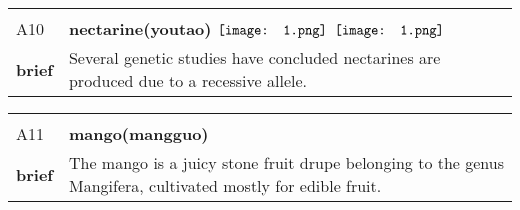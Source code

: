 \documentclass[UTF8]{article}
\begin{document}
            \begin{tabularx}{\textwidth}{p{1.5cm}X}
            \arrayrulecolor{myBlue}
        	\hline\\
            \small{A10}&
            \large{\bfseries{nectarine(youtao)}}\hfill
                                                            $\vcenter{\hbox{\texttt{[image: 1.png]}}}$
                                                                \phantom{$\vcenter{\hbox{\texttt{[image: 1.png]}}}$}
                                                                \phantom{$\vcenter{\hbox{\texttt{[image: 1.png]}}}$}
                                                                \phantom{$\vcenter{\hbox{\texttt{[image: 1.png]}}}$}
                                                                \phantom{$\vcenter{\hbox{\texttt{[image: 1.png]}}}$}
                                                                \phantom{$\vcenter{\hbox{\texttt{[image: 1.png]}}}$}
                                                                $\vcenter{\hbox{\texttt{[image: 1.png]}}}$
                                        \\[10pt]
            \large{\bfseries{brief}}&\noindent\parbox[c]{\hsize}{Several genetic studies have concluded nectarines are produced due to a recessive allele.} \\[5pt]
            \hline\\[-10pt]
        \end{tabularx}
            \begin{tabularx}{\textwidth}{p{1.5cm}X}
            \arrayrulecolor{myBlue}
        	\hline\\
            \small{A11}&
            \large{\bfseries{mango(mangguo)}}\hfill
                                                            \phantom{$\vcenter{\hbox{\texttt{[image: 1.png]}}}$}
                                                                \phantom{$\vcenter{\hbox{\texttt{[image: 1.png]}}}$}
                                                                \phantom{$\vcenter{\hbox{\texttt{[image: 1.png]}}}$}
                                                                \phantom{$\vcenter{\hbox{\texttt{[image: 1.png]}}}$}
                                                                \phantom{$\vcenter{\hbox{\texttt{[image: 1.png]}}}$}
                                                                \phantom{$\vcenter{\hbox{\texttt{[image: 1.png]}}}$}
                                                                \phantom{$\vcenter{\hbox{\texttt{[image: 1.png]}}}$}
                                        \\[10pt]
            \large{\bfseries{brief}}&\noindent\parbox[c]{\hsize}{The mango is a juicy stone fruit drupe belonging to the genus Mangifera, cultivated mostly for edible fruit. } \\[5pt]
            \hline\\[-10pt]
        \end{tabularx}
\end{document}
